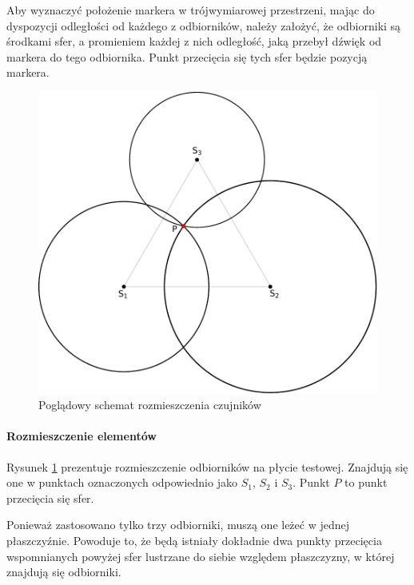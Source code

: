 Aby wyznaczyć położenie markera w trójwymiarowej przestrzeni, mając do dyspozycji odległości od każdego z odbiorników, należy założyć, że odbiorniki są środkami sfer, a promieniem każdej z nich \ppauza odległość, jaką przebył dźwięk od markera do tego odbiornika. Punkt przecięcia się tych sfer będzie pozycją markera.

\begin{figure}
  \includegraphics[width=\textwidth]{gfx/diagramy/schemat_przeciecia_sfer}
  \caption{Poglądowy schemat rozmieszczenia czujników}
  \label{fig:schema_spheres}
\end{figure}

\paragraph{Rozmieszczenie elementów}
Rysunek \ref{fig:schema_spheres} prezentuje rozmieszczenie odbiorników na płycie testowej. Znajdują się one w punktach oznaczonych odpowiednio jako $S_1$, $S_2$ i $S_3$. Punkt $P$ to punkt przecięcia się sfer.

Ponieważ zastosowano tylko trzy odbiorniki, muszą one leżeć w jednej płaszczyźnie. Powoduje to, że będą istniały dokładnie dwa punkty przecięcia wspomnianych powyżej sfer \ppauza lustrzane do siebie względem płaszczyzny, w której znajdują się odbiorniki.

